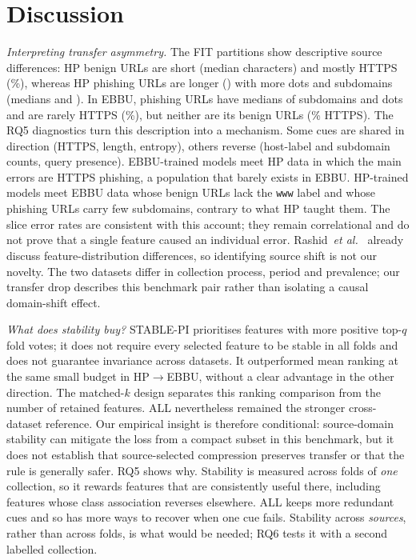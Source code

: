 \section{Discussion}
\textit{Interpreting transfer asymmetry.} The FIT partitions show descriptive source differences: HP benign URLs are short (median  characters) and mostly HTTPS (\%), whereas HP phishing URLs are longer () with more dots and subdomains (medians  and ). In EBBU, phishing URLs have medians of  subdomains and  dots and are rarely HTTPS (\%), but neither are its benign URLs (\% HTTPS). The RQ5 diagnostics turn this description into a mechanism. Some cues are shared in direction (HTTPS, length, entropy), others reverse (host-label and subdomain counts, query presence). EBBU-trained models meet HP data in which the main errors are HTTPS phishing, a population that barely exists in EBBU. HP-trained models meet EBBU data whose benign URLs lack the \texttt{www} label and whose phishing URLs carry few subdomains, contrary to what HP taught them. The slice error rates are consistent with this account; they remain correlational and do not prove that a single feature caused an individual error. Rashid~\textit{et al.}~\cite{rashid2024} already discuss feature-distribution differences, so identifying source shift is not our novelty. The two datasets differ in collection process, period and prevalence; our transfer drop describes this benchmark pair rather than isolating a causal domain-shift effect.

\textit{What does stability buy?} STABLE-PI prioritises features with more positive top-$q$ fold votes; it does not require every selected feature to be stable in all folds and does not guarantee invariance across datasets. It outperformed mean ranking at the same small budget in HP$\rightarrow$EBBU, without a clear advantage in the other direction. The matched-$k$ design separates this ranking comparison from the number of retained features. ALL nevertheless remained the stronger cross-dataset reference. Our empirical insight is therefore conditional: source-domain stability can mitigate the loss from a compact subset in this benchmark, but it does not establish that source-selected compression preserves transfer or that the rule is generally safer. RQ5 shows why. Stability is measured across folds of \emph{one} collection, so it rewards features that are consistently useful there, including features whose class association reverses elsewhere. ALL keeps more redundant cues and so has more ways to recover when one cue fails. Stability across \emph{sources}, rather than across folds, is what would be needed; RQ6 tests it with a second labelled collection.

